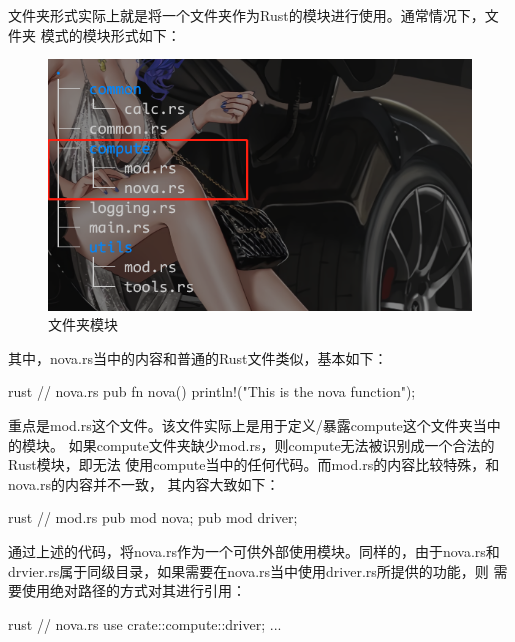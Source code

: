 文件夹形式实际上就是将一个文件夹作为Rust的模块进行使用。通常情况下，文件夹
模式的模块形式如下：
\begin{figure}[H]
  \centering
  \includegraphics[scale=0.4]{rust_mod_directory.png}
  \caption{文件夹模块}
  \label{fig:rust_mod_directory}
\end{figure}
其中，nova.rs当中的内容和普通的Rust文件类似，基本如下：
\begin{code-block}{rust}
// nova.rs
pub fn nova() {
    println!("This is the nova function");
}
\end{code-block}
重点是mod.rs这个文件。该文件实际上是用于定义/暴露compute这个文件夹当中的模块。
如果compute文件夹缺少mod.rs，则compute无法被识别成一个合法的Rust模块，即无法
使用compute当中的任何代码。而mod.rs的内容比较特殊，和nova.rs的内容并不一致，
其内容大致如下：
\begin{code-block}{rust}
// mod.rs
pub mod nova;
pub mod driver;
\end{code-block}
通过上述的代码，将nova.rs作为一个可供外部使用模块。同样的，由于nova.rs和
drvier.rs属于同级目录，如果需要在nova.rs当中使用driver.rs所提供的功能，则
需要使用绝对路径的方式对其进行引用：
\begin{code-block}{rust}
// nova.rs
use crate::compute::driver;
...
\end{code-block}


